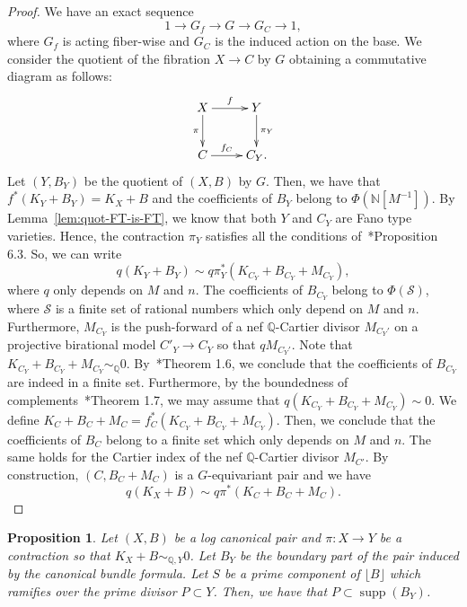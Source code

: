 \documentclass{amsart}
\newcommand{\supp}{\operatorname{supp}}
\renewcommand{\qq}{\mathbb{Q}}
\newcommand{\nn}{\mathbb{N}}
\newtheorem{proposition}[theorem]{Proposition}
\theoremstyle{remark}
\numberwithin{equation}{section}
\begin{document}
\begin{proof}
We have an exact sequence
\[
1\rightarrow G_f\rightarrow G \rightarrow G_C\rightarrow 1, 
\]
where $G_f$ is acting fiber-wise
and $G_C$ is the induced action on the base.
We consider the quotient of the fibration
$X\rightarrow C$ by $G$ obtaining a commutative diagram as follows:
\[
\xymatrix{
X  \ar[r]^-{f}\ar[d]_-{\pi} & Y\ar[d]^-{\pi_Y} \\
C \ar[r]^-{f_C} & C_Y.
}
\]
Let $(Y,B_Y)$ be the quotient of $(X,B)$ by $G$.
Then, we have that $f^*(K_Y+B_Y)=K_X+B$
and the coefficients of $B_Y$ belong to $\Phi\left(\nn\left[M^{-1}\right]\right)$.
By Lemma~\ref{lem:quot-FT-is-FT}, we know that both $Y$ and $C_Y$ are Fano type varieties.
Hence, the contraction $\pi_Y$ satisfies all the conditions of~\cite{Bir16a}*{Proposition 6.3}.
So, we can write
\[
q(K_Y+B_Y)\sim q\pi_Y^*(K_{C_Y}+B_{C_Y}+M_{C_Y}),
\]
where $q$ only depends on $M$ and $n$.
The coefficients of $B_{C_Y}$ belong to $\Phi(\mathcal{S})$,
where $\mathcal{S}$ is a finite set of rational numbers which only depend on $M$ and $n$.
Furthermore, $M_{C_Y}$ is the push-forward of a nef $\qq$-Cartier divisor $M_{C_Y'}$ on a projective birational model $C'_Y\rightarrow C_Y$ so that $q M_{C_Y'}$.
Note that $K_{C_Y}+B_{C_Y}+M_{C_Y}\sim_\qq 0$.
By~\cite{BZ16}*{Theorem 1.6}, we conclude that the coefficients of $B_{C_Y}$ are indeed in a finite set.
Furthermore, by the boundedness of complements~\cite{Bir16a}*{Theorem 1.7}, we may assume that $q(K_{C_Y}+B_{C_Y}+M_{C_Y})\sim 0$.
We define $K_C+B_C+M_C=f_C^*(K_{C_Y}+B_{C_Y}+M_{C_Y})$.
Then, we conclude that the coefficients of $B_C$ belong to a finite set which only depends on $M$ and $n$.
The same holds for the Cartier index of the nef $\qq$-Cartier divisor  $M_{C'}$.
By construction, $(C,B_C+M_C)$ is a $G$-equivariant pair and we have
\[
q(K_X+B)\sim q\pi^*(K_C+B_C+M_C).
\]
\end{proof}

\begin{proposition}\label{prop:ramification-rowndown}
Let $(X,B)$ be a log canonical pair and $\pi\colon X\rightarrow Y$ be a contraction so that $K_X+B\sim_{\qq,Y} 0$.
Let $B_Y$ be the boundary part of the pair induced by the canonical bundle formula.
Let $S$ be a prime component of $\lfloor B \rfloor$ which ramifies over the prime divisor $P\subset Y$.
Then, we have that $P\subset \supp(B_Y)$.
\end{proposition}
\end{document}
